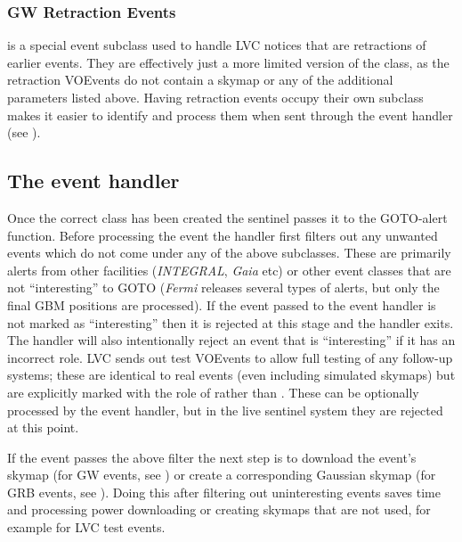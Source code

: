 \begin{colsection}
\begin{colsection}
\subsubsection{GW Retraction Events}

 is a special event subclass used to handle LVC notices that are retractions of earlier events. They are effectively just a more limited version of the  class, as the retraction VOEvents do not contain a skymap or any of the additional parameters listed above. Having retraction events occupy their own subclass makes it easier to identify and process them when sent through the event handler (see ).

\end{colsection}

\newpage
\subsection{The event handler}
\label{sec:event_handler}
\begin{colsection}

Once the correct  class has been created the sentinel passes it to the GOTO-alert  function. Before processing the event the handler first filters out any unwanted events which do not come under any of the above subclasses. These are primarily alerts from other facilities (\textit{INTEGRAL}, \textit{Gaia} etc) or other event classes that are not ``interesting'' to GOTO (\textit{Fermi} releases several types of alerts, but only the final GBM positions are processed). If the event passed to the event handler is not marked as ``interesting'' then it is rejected at this stage and the handler exits. The handler will also intentionally reject an event that is ``interesting'' if it has an incorrect role. LVC sends out test VOEvents to allow full testing of any follow-up systems; these are identical to real events (even including simulated skymaps) but are explicitly marked with the role of  rather than . These can be optionally processed by the event handler, but in the live sentinel system they are rejected at this point.

If the event passes the above filter the next step is to download the event's skymap (for GW events, see ) or create a corresponding Gaussian skymap (for GRB events, see ). Doing this after filtering out uninteresting events saves time and processing power downloading or creating skymaps that are not used, for example for LVC test events.


\end{colsection}
\end{colsection}
